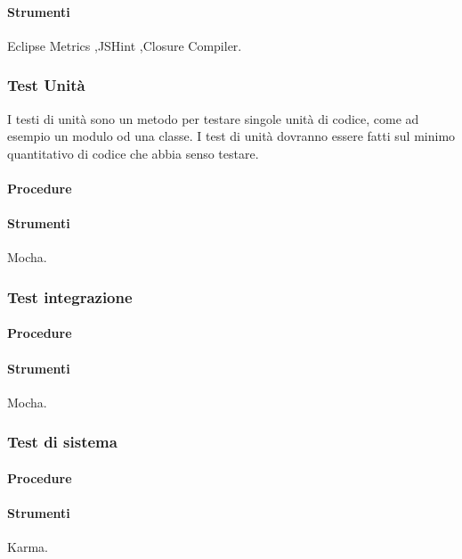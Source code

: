 \paragraph{Strumenti}
Eclipse Metrics ,JSHint ,Closure Compiler.



\subsubsection{Test Unità}
I testi di unità sono un metodo per testare singole unità di codice, come ad esempio un modulo od una classe. I test di unità dovranno essere fatti sul minimo quantitativo di codice che abbia senso testare.

\paragraph{Procedure}

\paragraph{Strumenti}
Mocha.

\subsubsection{Test integrazione}



\paragraph{Procedure}

\paragraph{Strumenti}
Mocha.

\subsubsection{Test di sistema}

\paragraph{Procedure}

\paragraph{Strumenti}
Karma.

